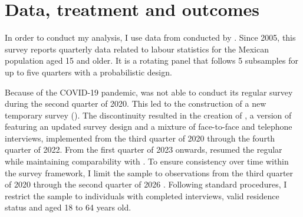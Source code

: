 \section{Data, treatment and outcomes}

In order to conduct my analysis, I use data from  conducted by . Since 2005, this survey reports quarterly data related to labour statistics for the Mexican population aged 15 and older. It is a rotating panel that follows 5 subsamples for up to five quarters with a probabilistic design.

Because of the COVID-19 pandemic,  was not able to conduct its regular survey during the second quarter of 2020. This led to the construction of a new temporary survey (). The discontinuity resulted in the creation of , a version of  featuring an updated survey design and a mixture of face-to-face and telephone interviews, implemented from the third quarter of 2020 through the fourth quarter of 2022. From the first quarter of 2023 onwards,  resumed the regular  while maintaining comparability with . To ensure consistency over time within the survey framework, I limit the sample to observations from the third quarter of 2020 through the second quarter of 2026 . Following standard  procedures, I restrict the sample to individuals with completed interviews, valid residence status and aged 18 to 64 years old.

